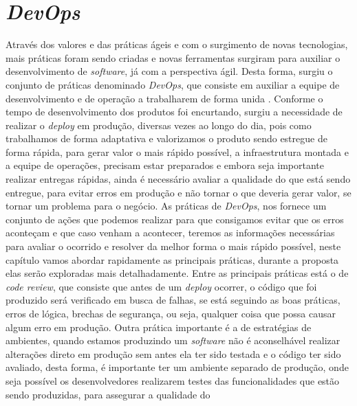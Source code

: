     \chapter{\textit{DevOps}}
      Através dos valores e das práticas ágeis e com o surgimento de novas
      tecnologias, mais práticas foram sendo criadas e novas ferramentas surgiram
      para auxiliar o desenvolvimento de \textit{software}, já com a perspectiva
      ágil. Desta forma, surgiu o conjunto de práticas denominado \textit{DevOps},
      que consiste em auxiliar a equipe de desenvolvimento e de operação a trabalharem
      de forma unida \cite{TheDevOpsHandbook}. Conforme o tempo de desenvolvimento
      dos produtos foi encurtando, surgiu a necessidade de realizar o \textit{deploy}
      em produção, diversas vezes ao longo do dia, pois como trabalhamos de forma
      adaptativa e valorizamos o produto sendo estregue de forma rápida, para gerar
      valor o mais rápido possível, a infraestrutura montada e a equipe de operações,
      precisam estar preparados e embora seja importante realizar entregas rápidas,
      ainda é necessário avaliar a qualidade do que está sendo entregue, para
      evitar erros em produção e não tornar o que deveria gerar valor, se tornar
      um problema para o negócio. \newline
      As práticas de \textit{DevOps}, nos fornece um conjunto de ações que podemos
      realizar para que consigamos evitar que os erros aconteçam e que caso venham
      a acontecer, teremos as informações necessárias para avaliar o ocorrido e
      resolver da melhor forma o mais rápido possível, neste capítulo vamos abordar
      rapidamente as principais práticas, durante a proposta elas serão exploradas
      mais detalhadamente. \newline
      Entre as principais práticas está o de \textit{code review}, que consiste
      que antes de um \textit{deploy} ocorrer, o código que foi produzido será
      verificado em busca de falhas, se está seguindo as boas práticas, erros de
      lógica, brechas de segurança, ou seja, qualquer coisa que possa causar algum
      erro em produção. Outra prática importante é a de estratégias de ambientes,
      quando estamos produzindo um \textit{software} não é aconselhável realizar
      alterações direto em produção sem antes ela ter sido testada e o código
      ter sido avaliado, desta forma, é importante ter um ambiente separado de
      produção, onde seja possível os desenvolvedores realizarem testes das
      funcionalidades que estão sendo produzidas, para assegurar a qualidade do
